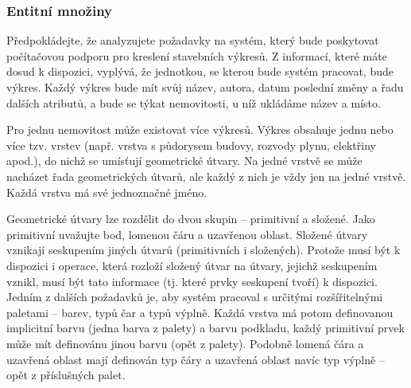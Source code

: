 \documentclass{beamer}
\begin{document}
  \begin{frame}
    \frametitle{Entitní množiny}
      \scriptsize{
      Předpokládejte, že analyzujete požadavky na systém, který bude poskytovat počítačovou 
      podporu pro kreslení stavebních výkresů. Z informací, které máte dosud k dispozici,
      vyplývá, že jednotkou, se kterou bude systém pracovat, bude \colorbox{blue!30}{výkres}. Každý výkres bude
      mít svůj název, autora, datum poslední změny a řadu dalších atributů, a bude se týkat
      \colorbox{blue!30}{nemovitosti}, u níž ukládáme název a místo.\par


      \hspace{0.5cm}Pro jednu nemovitost může existovat více výkresů. Výkres obsahuje jednu nebo více tzv.
      \colorbox{blue!30}{vrstev} (např. vrstva s půdorysem budovy, rozvody plynu, elektřiny apod.), do nichž se
      umísťují \colorbox{blue!30}{geometrické útvary}. Na jedné vrstvě se může nacházet řada geometrických útvarů,
      ale každý z nich je vždy jen na jedné vrstvě. Každá vrstva má své jednoznačné jméno.\par

  
      \hspace{0.5cm}Geometrické útvary lze rozdělit do dvou skupin -- \colorbox{blue!30}{primitivní} a \colorbox{blue!30}{složené}. Jako primitivní
      uvažujte bod, lomenou čáru a uzavřenou oblast. Složené útvary vznikají seskupením jiných
      útvarů (primitivních i složených). Protože musí být k dispozici i operace, která rozloží
      složený útvar na útvary, jejichž seskupením vznikl, musí být tato informace (tj. které
      prvky seskupení tvoří) k dispozici. Jedním z dalších požadavků je, aby systém pracoval
      s určitými rozšířitelnými paletami -- barev, typů čar a typů výplně. Každá vrstva má
      potom definovanou implicitní barvu (jedna barva  z  palety) a barvu podkladu, každý
      primitivní prvek může mít definovánu jinou barvu (opět z palety). Podobně lomená čára
      a uzavřená oblast mají definován typ čáry a uzavřená oblast navíc typ výplně – opět
      z příslušných palet.\par}
  \end{frame}
\end{document}
